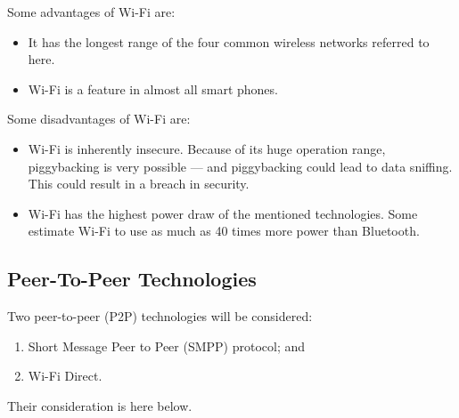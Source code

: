 \documentclass[12pt,svgnames,smaller]{article} %
\begin{document}
\begin{enumerate}
		Some advantages of Wi-Fi are:
		
		\begin{itemize}
			\item It has the longest range of the four common wireless networks referred to here.
			\item Wi-Fi is a feature in almost all smart phones.
		\end{itemize}
		
		Some disadvantages of Wi-Fi are:
		
		\begin{itemize}
			\item Wi-Fi is inherently insecure. Because of its huge operation range, piggybacking is very possible --- and piggybacking could lead to data sniffing. This could result in a breach in security.
			\item Wi-Fi has the highest power draw of the mentioned technologies. Some estimate Wi-Fi to use as much as 40 times more power than Bluetooth.
		\end{itemize}
		
	\end{enumerate}
	
	\subsection{Peer-To-Peer Technologies}
	
	Two peer-to-peer (P2P) technologies will be considered:
	
	\begin{enumerate}
		\item Short Message Peer to Peer (SMPP) protocol; and 
		\item Wi-Fi Direct.
	\end{enumerate}
	
	Their consideration is here below.
	
\end{document}
